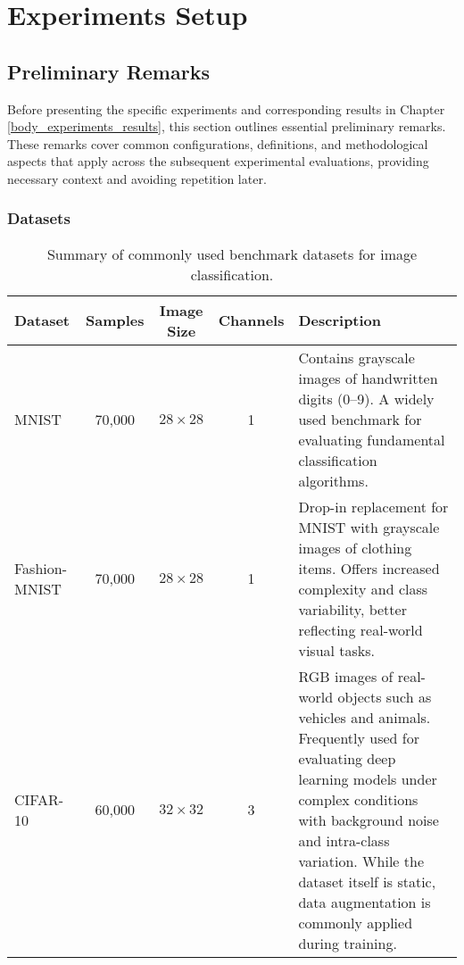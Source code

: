 \section{Experiments Setup}\label{body_experiments_setup}

\subsection{Preliminary Remarks}\label{body_prelim}
Before presenting the specific experiments and corresponding results in Chapter \ref{body_experiments_results}, this section outlines essential preliminary remarks. These remarks cover common configurations, definitions, and methodological aspects that apply across the subsequent experimental evaluations, providing necessary context and avoiding repetition later.
\subsubsection{Datasets}

\begin{table}[H]
    \centering
    \vspace{-1.5em}
    \caption{Summary of commonly used benchmark datasets for image classification.}
    \label{tab:dataset_summary}
    \begin{tabular}{|p{1.8cm}|c|c|c|p{6cm}|} %
        \hline
        \textbf{Dataset} & \textbf{Samples} & \textbf{Image Size} & \textbf{Channels} & \textbf{Description} \\
        \hline
        MNIST & 70,000 & $28 \times 28$ & 1 & Contains grayscale images of handwritten digits (0–9). A widely used benchmark for evaluating fundamental classification algorithms. \\
        \hline
        Fashion-MNIST & 70,000 & $28 \times 28$ & 1 & Drop-in replacement for MNIST with grayscale images of clothing items. Offers increased complexity and class variability, better reflecting real-world visual tasks. \\
        \hline
        CIFAR-10 & 60,000 & $32 \times 32$ & 3 & RGB images of real-world objects such as vehicles and animals. Frequently used for evaluating deep learning models under complex conditions with background noise and intra-class variation. While the dataset itself is static, data augmentation is commonly applied during training. \\
        \hline
    \end{tabular}
\end{table}



